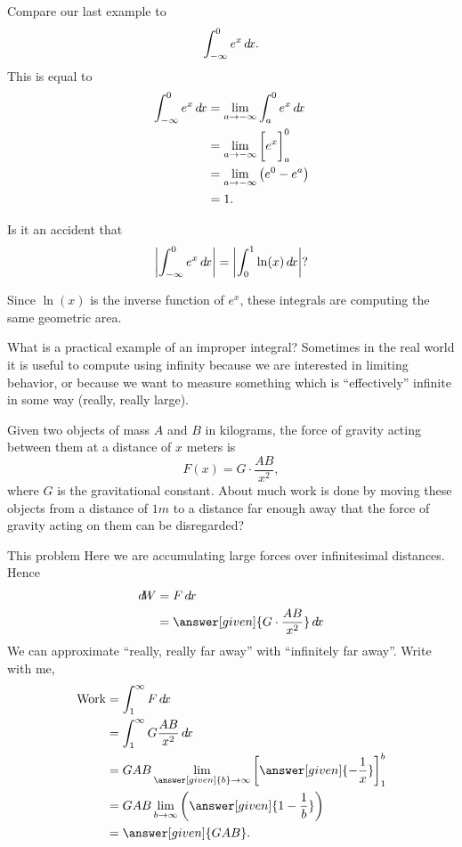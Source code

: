 \documentclass{ximera}
\begin{document}
Compare our last example to
\[
\int_{-\infty}^0 e^x \mathop{}\!d\! x.
\]
This is equal to
\begin{align*}
  \int_{-\infty}^0 e^x \mathop{}\!d\! x &= \lim_{a\to -\infty} \int_a^0 e^x \mathop{}\!d\! x\\
  &= \lim_{a\to-\infty}\bigg[ e^x \bigg]_{a}^0 \\
  &= \lim_{a\to-\infty}\left(e^0 - e^a\right) \\
  &=1.
\end{align*}


\begin{question}
  Is it an accident that
  \[
  \left|\int_{-\infty}^0 e^x \mathop{}\!d\! x \right|= \left| \int_0^1 \ln(x)\mathop{}\!d\! x \right|?
  \]
  \begin{prompt}
  \begin{multipleChoice}
  \end{multipleChoice}
  \begin{feedback}
    Since $\ln(x)$ is the inverse function of $e^x$, these integrals
    are computing the same geometric area.
  \end{feedback}
  \end{prompt}
\end{question}


What is a practical example of an improper integral?  Sometimes in the
real world it is useful to compute using infinity because we are
interested in limiting behavior, or because we want to measure
something which is ``effectively'' infinite in some way (really, really
large).

\begin{example}
  Given two objects of mass $A$ and $B$ in kilograms, the force of
  gravity acting between them at a distance of $x$ meters is
  \[
  F(x) = G\cdot \frac{AB}{x^2},
  \]
  where $G$ is the gravitational constant.  About much work is done by
  moving these objects from a distance of $1 \unit{m}$ to a distance
  far enough away that the force of gravity acting on them can be
  disregarded?
  \begin{explanation}
    This problem Here we are accumulating large forces over
    infinitesimal distances. Hence
    \begin{align*}
      \d W &= F \d x\\
      &= \answer[given]{G\cdot \frac{AB}{x^2}} \d x
    \end{align*}
    We can approximate ``really, really far away'' with ``infinitely far away''. Write with me,
    \begin{align*}
      \textrm{Work} &= \int_1^\infty F \d x\\
      &= \int_1^\infty G\frac{AB}{x^2} \d x\\
      &= GAB \lim_{\answer[given]{b} \to \infty} \eval{\answer[given]{-\frac{1}{x}}}_1^b\\
      &=GAB \lim_{b \to \infty} \left(\answer[given]{1 - \frac{1}{b}}\right)\\
      &=\answer[given]{GAB}.
    \end{align*}
  \end{explanation}
\end{example}
\end{document}
